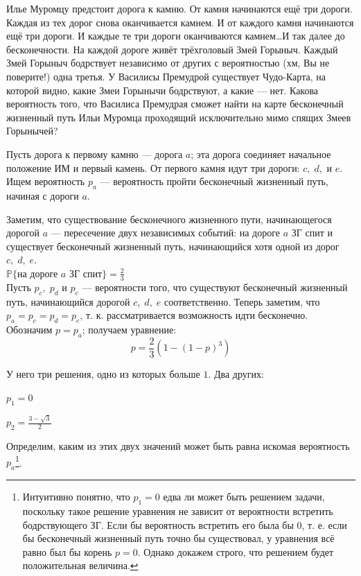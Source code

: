 \documentclass[nobib]{tufte-handout}
\theoremstyle{definition}
\newcounter{problem}
\newenvironment{problem}%
{%
\refstepcounter{problem}%
     \hypertarget{problem:{\theproblem}}{}
     \Writetofile{solution_file}{\protect\hypertarget{soln:\theproblem}{}}
     \begin{myenum}[label=\bfseries\protect\hyperlink{soln:\theproblem}{\theproblem},ref=\theproblem]
     \item%
    }%
    {%
    \end{myenum}}
\renewcommand{\P}{\mathbb{P}}
\begin{document}
\begin{problem}
Илье Муромцу предстоит дорога к камню. От камня начинаются ещё три дороги. Каждая из тех дорог снова оканчивается камнем. И от каждого камня начинаются ещё три дороги. И каждые те три дороги оканчиваются камнем\ldots И так далее до бесконечности. На каждой дороге живёт трёхголовый Змей Горыныч. Каждый Змей Горыныч бодрствует независимо от других с вероятностью (хм, Вы не поверите!) одна третья. У Василисы Премудрой существует Чудо-Карта, на которой видно, какие Змеи Горынычи бодрствуют, а какие — нет. Какова вероятность того, что Василиса Премудрая сможет найти на карте  бесконечный жизненный путь Ильи Муромца проходящий исключительно мимо спящих Змеев Горынычей?


\begin{sol}
Пусть дорога к первому камню — дорога $a$; эта дорога соединяет начальное положение ИМ и первый камень. От первого камня идут три дороги: $c, \; d,\text{ и }e$. Ищем вероятность $p_a$ — вероятность пройти бесконечный жизненный путь, начиная с дороги $a$.

Заметим, что существование бесконечного жизненного пути, начинающегося дорогой $a$ — пересечение двух независимых событий: на дороге $a$ ЗГ спит и существует бесконечный жизненный путь, начинающийся хотя одной из дорог $c, \; d, \; e$.
~\\

$\P \text{\{на дороге } a \text{ ЗГ спит\}} = \frac{2}{3}$
~\\

Пусть $p_c,\; p_d$ и $p_e$ — вероятности того, что существуют бесконечный жизненный путь, начинающийся дорогой $c, \; d, \; e$ соответственно. Теперь заметим, что $p_a=p_c= p_d=p_e$, т. к. рассматривается возможность идти бесконечно. Обозначим $p = p_a$; получаем уравнение:
\[
p = \frac{2}{3}\left(1 - (1-p)^3\right)
\]

У него три решения, одно из которых больше $1$. Два других:
\begin{center}
\begin{minipage}{52mm}
$p_1=0$
\end{minipage}
\hspace{0mm}
\begin{minipage}{22mm}
$p_2=\frac{3 - \sqrt{3}}{2}$
\end{minipage}
\end{center}

Определим, каким из этих двух значений может быть равна искомая вероятность $p_a$\footnote{Интуитивно понятно, что $p_1=0$ едва ли может быть решением задачи, поскольку такое решение уравнения не зависит от вероятности встретить бодрствующего ЗГ. Если бы вероятность встретить его была бы $0$, т. е. если бы бесконечный жизненный путь точно бы существовал, у уравнения всё равно был бы корень $p=0$. Однако докажем строго, что решением будет положительная величина.}.


\end{sol}
\end{problem}
\end{document}
